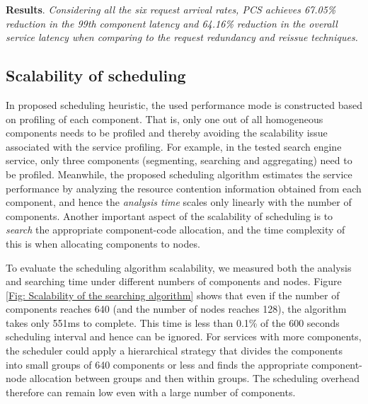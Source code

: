 \documentclass[10pt, conference, compsocconf]{IEEEtran}
\begin{document}
\textbf{Results}. \emph{Considering all the six request arrival rates, PCS achieves 67.05\% reduction in the 99th component latency and 64.16\% reduction in the overall service latency when comparing to the request redundancy and reissue techniques.}







































\subsection{Scalability of scheduling} \label{Section: Scalability of scheduling}



In proposed scheduling heuristic, the used performance mode is constructed based on profiling of each component. That is, only one out of all homogeneous components needs to be profiled and thereby avoiding the scalability issue associated with the service profiling. For example, in the tested search engine service, only three components (segmenting, searching and aggregating) need to be profiled. Meanwhile, the proposed scheduling algorithm estimates the service performance by analyzing the resource contention information obtained from each component, and hence the \emph{analysis time} scales only linearly with the number of components. Another important aspect of the scalability of scheduling is to \emph{search} the appropriate component-code allocation, and the time complexity of this is  when allocating  components to  nodes.

To evaluate the scheduling algorithm scalability, we measured both the analysis and searching time under different numbers of components and nodes. Figure \ref{Fig: Scalability of the searching algorithm} shows that even if the number of components reaches 640 (and the number of nodes reaches 128), the algorithm takes only 551ms to complete. This time is less than 0.1\% of the 600 seconds scheduling interval and hence can be ignored. For services with more components, the scheduler could apply a hierarchical strategy that divides the components into small groups of 640 components or less and finds the appropriate component-node allocation between groups and then within groups. The scheduling overhead therefore can remain low even with a large number of components.
\end{document}
